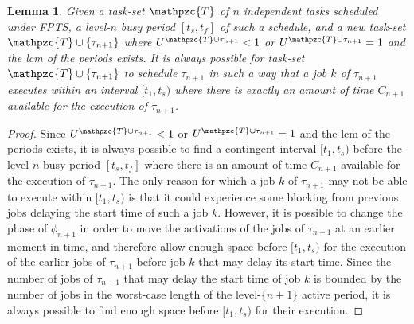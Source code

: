 \documentclass[fleqn]{article}
\newtheorem{lemma}{Lemma}
\begin{document}

\begin{lemma}
	Given a task-set $\mathpzc{T}$ of $n$ independent tasks scheduled under FPTS, a level-$n$ busy period $[t_s,t_f]$ of such a schedule, and a new task-set $\mathpzc{T} \cup \{\tau_{n+1}\}$ where $U^{\mathpzc{T} \cup \tau_{n+1}}<1$ or $U^{\mathpzc{T} \cup \tau_{n+1}} = 1$ and the lcm of the periods exists. It is always possible for task-set $\mathpzc{T} \cup \{\tau_{n+1}\}$ to schedule $\tau_{n+1}$ in such a way that a job $k$ of $\tau_{n+1}$ executes within an interval $[t_1,t_s)$ where there is exactly  an amount of time $C_{n+1}$ available for the execution of $\tau_{n+1}$.
\end{lemma}

\begin{proof}
	Since $U^{\mathpzc{T} \cup \tau_{n+1}}<1$ or $U^{\mathpzc{T} \cup \tau_{n+1}} = 1$ and the lcm of the periods exists, it is always possible to find a contingent interval $[t_1,t_s)$ before the level-$n$ busy period $[t_s,t_f]$ where there is an amount of time $C_{n+1}$ available for the execution of $\tau_{n+1}$. The only reason for which a job $k$ of $\tau_{n+1}$ may not be able to execute within $[t_1,t_s)$ is that it could experience some blocking from previous jobs delaying the start time of such a job $k$. However, it is possible to change the phase of $\phi_{n+1}$ in order to move the activations of the jobs of $\tau_{n+1}$ at an earlier moment in time, and therefore allow enough space before $[t_1,t_s)$ for the execution of the earlier jobs of $\tau_{n+1}$ before job $k$ that may delay its start time. Since the number of jobs of $\tau_{n+1}$ that may delay the start time of job $k$ is bounded by the number of jobs in the worst-case length of the level-$\{n+1\}$ active period, it is always possible to find enough space before $[t_1,t_s)$ for their execution.
\end{proof}
\end{document}
